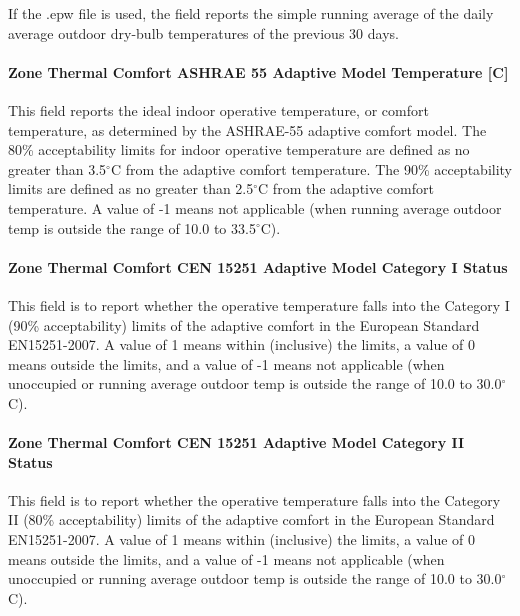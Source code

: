 If the .epw file is used, the field reports the simple running average of the daily average outdoor dry-bulb temperatures of the previous 30 days.

\paragraph{Zone Thermal Comfort ASHRAE 55 Adaptive Model Temperature {[}C{]}}\label{zone-thermal-comfort-ashrae-55-adaptive-model-temperature-c}

This field reports the ideal indoor operative temperature, or comfort temperature, as determined by the ASHRAE-55 adaptive comfort model. The 80\% acceptability limits for indoor operative temperature are defined as no greater than 3.5$^\circ$C from the adaptive comfort temperature. The 90\% acceptability limits are defined as no greater than 2.5$^\circ$C from the adaptive comfort temperature. A value of -1 means not applicable (when running average outdoor temp is outside the range of 10.0 to 33.5$^\circ$C).

\paragraph{Zone Thermal Comfort CEN 15251 Adaptive Model Category I Status}\label{zone-thermal-comfort-cen-15251-adaptive-model-category-i-status}

This field is to report whether the operative temperature falls into the Category I (90\% acceptability) limits of the adaptive comfort in the European Standard EN15251-2007. A value of 1 means within (inclusive) the limits, a value of 0 means outside the limits, and a value of -1 means not applicable (when unoccupied or running average outdoor temp is outside the range of 10.0 to 30.0$^\circ$C).

\paragraph{Zone Thermal Comfort CEN 15251 Adaptive Model Category II Status}\label{zone-thermal-comfort-cen-15251-adaptive-model-category-ii-status}

This field is to report whether the operative temperature falls into the Category II (80\% acceptability) limits of the adaptive comfort in the European Standard EN15251-2007. A value of 1 means within (inclusive) the limits, a value of 0 means outside the limits, and a value of -1 means not applicable (when unoccupied or running average outdoor temp is outside the range of 10.0 to 30.0$^\circ$C).

